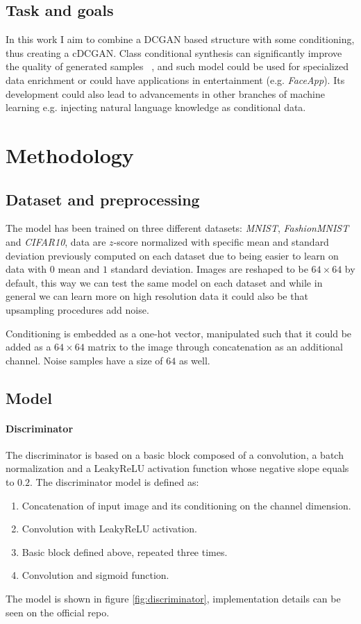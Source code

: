 \documentclass[10pt,twocolumn,letterpaper]{article}
\begin{document}
\subsection{Task and goals}
In this work I aim to combine a DCGAN based structure with some conditioning, thus creating a cDCGAN.
Class conditional synthesis can significantly improve the quality of generated samples ~\cite{DBLP:journals/corr/OordKK16}, and such model could be used for specialized data enrichment or could have applications in entertainment (e.g. \textit{FaceApp}).
Its development could also lead to advancements in other branches of machine learning e.g. injecting natural language knowledge as conditional data.

\section{Methodology}

\subsection{Dataset and preprocessing}
The model has been trained on three different datasets: \textit{MNIST}, \textit{FashionMNIST} and \textit{CIFAR10}, data are $z$-score normalized with specific mean and standard deviation previously computed on each dataset due to being easier to learn on data with $0$ mean and $1$ standard deviation.
Images are reshaped to be $64\times64$ by default, this way we can test the same model on each dataset and while in general we can learn more on high resolution data it could also be that upsampling procedures add noise.

Conditioning is embedded as a one-hot vector, manipulated such that it could be added as a $64\times64$ matrix to the image through concatenation as an additional channel.
Noise samples have a size of $64$ as well.

\subsection{Model}
\paragraph{Discriminator}
The discriminator is based on a basic block composed of a convolution, a batch normalization and a LeakyReLU activation function whose negative slope equals to $0.2$.
The discriminator model is defined as:
\begin{enumerate}
   \item Concatenation of input image and its conditioning on the channel dimension.
   \item Convolution with LeakyReLU activation.
   \item Basic block defined above, repeated three times.
   \item Convolution and sigmoid function.
\end{enumerate}
The model is shown in figure \ref{fig:discriminator}, implementation details can be seen on the official repo.
\end{document}
